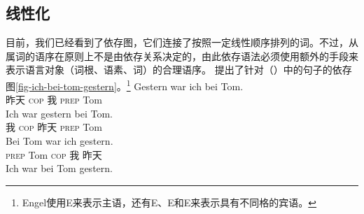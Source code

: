 \subsection{线性化}
\label{sec-dg-linearization}

目前，我们已经看到了依存图，它们连接了按照一定线性顺序排列的词。不过，从属词的语序在原则上不是由依存关系决定的，由此依存语法必须使用额外的手段来表示语言对象（词根、语素、词）的合理语序。 \citet[]{Engel2014a}提出了针对（）中的句子的依存图\vref{fig-ich-bei-tom-gestern}。\footnote{%
Engel使用E来表示主语，还有E、E和E来表示具有不同格的宾语。
}
\eal
\label{ex-gestern-war-ich-bei-tom}
\ex 
\gll Gestern war ich bei Tom.\\
     昨天 \textsc{cop} 我 \textsc{prep} Tom\\
\ex 
\gll Ich war gestern bei Tom.\\
     我   \textsc{cop} 昨天 \textsc{prep} Tom\\
\ex 
\gll Bei Tom war ich gestern.\\
     \textsc{prep} Tom  \textsc{cop} 我 昨天\\
\ex 
\gll Ich war bei Tom gestern.\\
